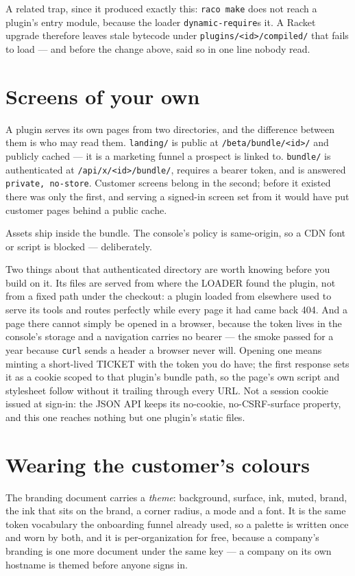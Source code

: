 \documentclass[11pt,a4paper]{report}
\begin{document}
A related trap, since it produced exactly this: \texttt{raco make} does not reach a plugin's entry module, because the loader \texttt{dynamic-require}s it. A Racket upgrade therefore leaves stale bytecode under \texttt{plugins/<id>/compiled/} that fails to load --- and before the change above, said so in one line nobody read.

\section{Screens of your own}

A plugin serves its own pages from two directories, and the difference between them is who may read them. \texttt{landing/} is public at \texttt{/beta/bundle/<id>/} and publicly cached --- it is a marketing funnel a prospect is linked to. \texttt{bundle/} is authenticated at \texttt{/api/x/<id>/bundle/}, requires a bearer token, and is answered \texttt{private, no-store}. Customer screens belong in the second; before it existed there was only the first, and serving a signed-in screen set from it would have put customer pages behind a public cache.

Assets ship inside the bundle. The console's policy is same-origin, so a CDN font or script is blocked --- deliberately.

Two things about that authenticated directory are worth knowing before you build on it. Its files are served from where the LOADER found the plugin, not from a fixed path under the checkout: a plugin loaded from elsewhere used to serve its tools and routes perfectly while every page it had came back 404. And a page there cannot simply be opened in a browser, because the token lives in the console's storage and a navigation carries no bearer --- the smoke passed for a year because \texttt{curl} sends a header a browser never will. Opening one means minting a short-lived TICKET with the token you do have; the first response sets it as a cookie scoped to that plugin's bundle path, so the page's own script and stylesheet follow without it trailing through every URL. Not a session cookie issued at sign-in: the JSON API keeps its no-cookie, no-CSRF-surface property, and this one reaches nothing but one plugin's static files.

\section{Wearing the customer's colours}

The branding document carries a \emph{theme}: background, surface, ink, muted, brand, the ink that sits on the brand, a corner radius, a mode and a font. It is the same token vocabulary the onboarding funnel already used, so a palette is written once and worn by both, and it is per-organization for free, because a company's branding is one more document under the same key --- a company on its own hostname is themed before anyone signs in.
\end{document}
